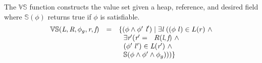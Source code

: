 \begin{definition}
\label{def:VS}
The $\mathbb{VS}$ function constructs the value set given a
heap, reference, and desired field where $\mathbb{S}(\phi)$ returns true if $\phi$ is satisfiable.
\[
\begin{array}{rcl}
  \mathbb{VS}(\emph{L},\emph{R},\phi_g,\emph{r},\emph{f}) & = &
  \{(\phi\wedge\phi^\prime\ \emph{l}^\prime) \mid \exists
  \emph{l}\ ((\phi\ l) \in L(r)\ \wedge \\ & &
  \ \ \exists \emph{r}^\prime ( \emph{r}^\prime =
  \ \ R(\emph{l},\emph{f})\ \wedge \\ & & 
  \ \ (\phi^\prime\ l^\prime) \in \emph{L}(\emph{r}^\prime)\ \wedge \\ & &
  \ \ \mathbb{S}(\phi\wedge\phi^\prime\wedge \phi_g)))\}
\end{array}
\]
\end{definition}
